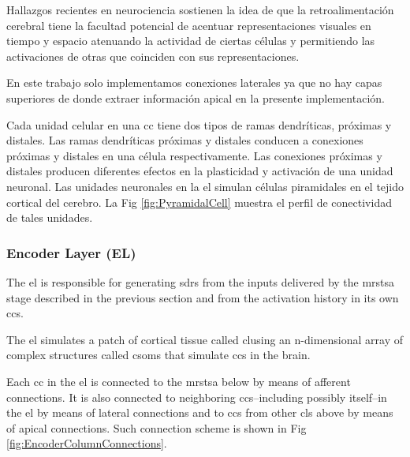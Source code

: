 {Hallazgos recientes en neurociencia \cite{Marques2018} sostienen la idea
de que la retroalimentación cerebral tiene la facultad potencial de acentuar representaciones visuales en tiempo y espacio
atenuando la actividad de ciertas células y permitiendo las activaciones de otras
que coinciden con sus representaciones.

En este trabajo solo implementamos conexiones laterales ya que
no hay capas superiores
de donde extraer información apical en la presente implementación.

Cada unidad celular en una \gls{cc} tiene dos tipos de ramas dendríticas, próximas y distales.
Las ramas dendríticas próximas y distales conducen a conexiones próximas y distales en una célula respectivamente.
Las conexiones próximas y distales producen diferentes efectos en la plasticidad y activación de una unidad neuronal.
Las unidades neuronales en la \gls{el} simulan células piramidales en el tejido cortical del cerebro.
La Fig \ref{fig:PyramidalCell} muestra el perfil de conectividad de tales unidades.
}{
\subsubsection{Encoder Layer (EL)}

The \gls{el} is responsible for generating \glspl{sdr} from the inputs delivered by the \gls{mrstsa} stage
described in the previous section and from the activation history in its own \glspl{cc}.

The \gls{el} simulates a patch of cortical tissue called \gls{cl}using an n-dimensional array of complex structures called \glspl{csom} that simulate \glspl{cc} in the brain.

Each \gls{cc} in the \gls{el} is connected to the \gls{mrstsa} below by means of afferent connections. It is also
connected to neighboring \glspl{cc}--including possibly itself--in the \gls{el} by means of lateral connections and
to \glspl{cc} from other \glspl{cl} above by means of apical connections. Such connection scheme is shown in Fig \ref{fig:EncoderColumnConnections}.

}
